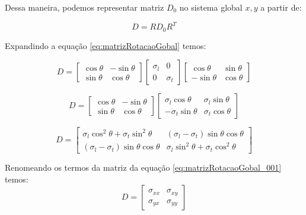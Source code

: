 \documentclass[
12pt,
a4paper,
oneside,
chapter=TITLE,
sumario=tradicional
]{abntex2}
\begin{document}
Dessa maneira,  podemos representar matriz $D_0$ no sistema global $x,y$ a partir de:

\begin{equation} %
D = R D_0 R^T 
	\label{eq:matrizRotacaoGobal}
\end{equation}

Expandindo a equação \ref{eq:matrizRotacaoGobal} temos:


\begin{equation*} %
D =
	\begin{bmatrix}  
	\cos\theta & -\sin\theta \\  
	\sin\theta & \cos\theta  
	\end{bmatrix} 	
	\begin{bmatrix}  
	\sigma_l & 0 \\  
	0 & \sigma_t  
	\end{bmatrix}  
	\begin{bmatrix}  
		\cos\theta & \sin\theta \\  
		-\sin\theta & \cos\theta  
	\end{bmatrix} 
\end{equation*}

\begin{equation*} %
	D =
	\begin{bmatrix}  
		\cos\theta & -\sin\theta \\  
		\sin\theta & \cos\theta  
	\end{bmatrix} 	
	\begin{bmatrix}  
		\sigma_l\cos\theta & \sigma_l\sin\theta \\  
		-\sigma_t\sin\theta & \sigma_t\cos\theta  
	\end{bmatrix}  
\end{equation*}

\begin{equation} %
D =
\begin{bmatrix}  
	\sigma_l \cos^2\theta + \sigma_t \sin^2\theta  
	&  
	(\sigma_l-\sigma_t)\sin\theta\cos\theta  
	\\  
	(\sigma_l-\sigma_t)\sin\theta\cos\theta  
	&  
	\sigma_l \sin^2\theta + \sigma_t \cos^2\theta  
\end{bmatrix} 
	\label{eq:matrizRotacaoGobal_001}
\end{equation}

Renomeando os termos da matriz da equação \ref{eq:matrizRotacaoGobal_001} temos:
\begin{equation} %
	D =
	\begin{bmatrix}  
		\sigma_{xx} & \sigma_{xy} \\  
		\sigma_{yx} &\sigma_{yy} 
		\label{eq:tensorSigma_001}
	\end{bmatrix} 	
\end{equation}
\end{document}
